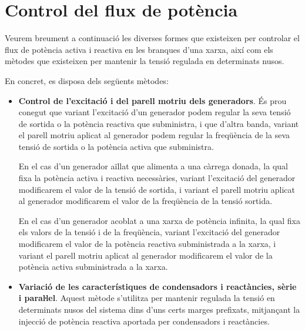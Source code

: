 \section{Control del flux de potència} \label{sec:control-flux-pot}

Veurem breument a continuació les diverses formes que existeixen
per controlar el flux de potència activa i reactiva en les branques
d'una xarxa, així com els mètodes que existeixen per mantenir la
tensió regulada en determinats nusos.

En concret, es disposa dels següents mètodes:

\begin{itemize}
 \item \textbf{Control de l'excitació i del parell motriu dels generadors}. És prou conegut
    que variant l'excitació d'un generador podem regular la seva tensió de sortida o
        la potència reactiva que subministra, i que d'altra banda, variant el parell motriu aplicat al generador
    podem regular la freqüència de la seva tensió de sortida o la potència activa que subministra.

    En el cas d'un generador aïllat que alimenta a una càrrega
    donada, la qual fixa la potència activa i reactiva necessàries, variant
     l'excitació del generador modificarem el valor de la tensió de sortida, i variant el parell motriu aplicat al generador modificarem el valor de la freqüència de la tensió sortida.

     En el cas d'un generador acoblat a una xarxa de potència
    infinita, la qual fixa els valors de la tensió i de la freqüència, variant l'excitació del generador modificarem el valor de la potència reactiva subministrada a la xarxa, i variant el parell motriu aplicat al     generador modificarem el valor de la potència
    activa  subministrada a la xarxa.

   \item \textbf{Variació de les característiques de condensadors i reactàncies, sèrie
    i paraŀlel}. Aquest mètode s'utilitza per mantenir regulada la tensió en determinats
     nusos del sistema dins d'uns certs marges prefixats, mitjançant la injecció  de potència
      reactiva aportada per condensadors i reactàncies.


\end{itemize}
